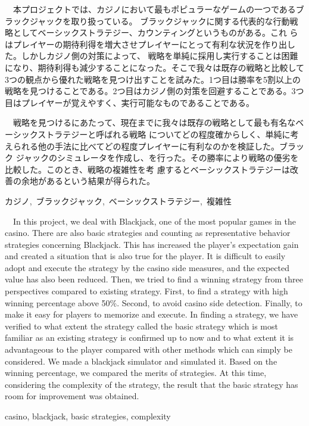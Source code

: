 \documentclass[11pt,a4paper,oneside]{jsbook}
\begin{document}
\maketitle
{}
\fontsize{10}{18}\selectfont
\frontmatter

\begin{jabstract} 
\ \ 本プロジェクトでは、カジノにおいて最もポピュラーなゲームの一つであるブラックジャックを取り扱っている。
ブラックジャックに関する代表的な行動戦略としてベーシックストラテジー、カウンティングというものがある。これ
らはプレイヤーの期待利得を増大させプレイヤーにとって有利な状況を作り出した。しかしカジノ側の対策によって、
戦略を単純に採用し実行することは困難になり、期待利得も減少することになった。そこで我々は既存の戦略と比較して
 3つの観点から優れた戦略を見つけ出すことを試みた。1つ目は勝率を5割以上の戦略を見つけることである。2つ目はカジノ側の対策を回避することである。3つ目はプレイヤーが覚えやすく、実行可能なものであることである。

\ \ 戦略を見つけるにあたって、現在までに我々は既存の戦略として最も有名なベーシックストラテジーと呼ばれる戦略
についてどの程度確からしく、単純に考えられる他の手法に比べてどの程度プレイヤーに有利なのかを検証した。ブラック
ジャックのシミュレータを作成し、を行った。その勝率により戦略の優劣を比較した。このとき、戦略の複雑性を考
慮するとベーシックストラテジーは改善の余地があるという結果が得られた。
\begin{jkeyword}
カジノ,\ ブラックジャック,\ ベーシックストラテジー,\ 複雑性
\end{jkeyword}
\end{jabstract}

\begin{eabstract} 
\ \ In this project, we deal with Blackjack, one of the most popular games in the casino. There are
also basic strategies and counting as representative behavior strategies concerning Blackjack. This
has increased the player's expectation gain and created a situation that is also true for the player. It is difficult to easily adopt and execute the strategy by the casino side measures, and the expected value has also been reduced. Then, we tried to find a winning strategy from three perspectives compared to existing strategy. First, to find a strategy with high winning percentage above 50\%. Second, to avoid casino side detection. Finally, to make it easy for players to memorize and execute. In finding a strategy, we have verified to what extent the strategy called the basic strategy which 
is most familiar as an existing strategy is confirmed up to now and to what extent it is advantageous to 
the player compared with other methods which can simply be considered. We made a blackjack simulator and 
simulated it. Based on the winning percentage, we compared the merits of strategies. At this time, considering 
the complexity of the strategy, the result that the basic strategy has room for improvement was obtained.

\begin{ekeyword}
casino, blackjack, basic strategies, complexity
\end{ekeyword}
\end{eabstract}
\end{document}
